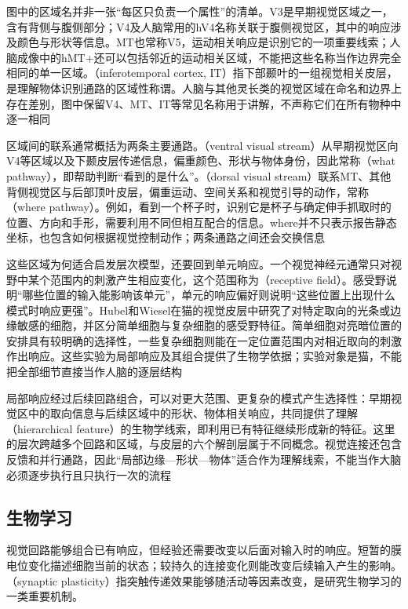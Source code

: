 图中的区域名并非一张“每区只负责一个属性”的清单。V3是早期视觉区域之一，含有背侧与腹侧部分；V4及人脑常用的hV4名称关联于腹侧视觉区，其中的响应涉及颜色与形状等信息。MT也常称V5，运动相关响应是识别它的一项重要线索；人脑成像中的hMT+还可以包括邻近的运动相关区域，不能把这些名称当作边界完全相同的单一区域。（inferotemporal cortex, IT）指下部颞叶的一组视觉相关皮层，是理解物体识别通路的区域性称谓。人脑与其他灵长类的视觉区域在命名和边界上存在差别，图中保留V4、MT、IT等常见名称用于讲解，不声称它们在所有物种中逐一相同

区域间的联系通常概括为两条主要通路。（ventral visual stream）从早期视觉区向V4等区域以及下颞皮层传递信息，偏重颜色、形状与物体身份，因此常称（what pathway），即帮助判断“看到的是什么”。（dorsal visual stream）联系MT、其他背侧视觉区与后部顶叶皮层，偏重运动、空间关系和视觉引导的动作，常称（where pathway）。例如，看到一个杯子时，识别它是杯子与确定伸手抓取时的位置、方向和手形，需要利用不同但相互配合的信息。where并不只表示报告静态坐标，也包含如何根据视觉控制动作；两条通路之间还会交换信息

\FloatBarrier
这些区域为何适合启发层次模型，还要回到单元响应。一个视觉神经元通常只对视野中某个范围内的刺激产生相应变化，这个范围称为（receptive field）。感受野说明“哪些位置的输入能影响该单元”，单元的响应偏好则说明“这些位置上出现什么模式时响应更强”。Hubel和Wiesel在猫的视觉皮层中研究了对特定取向的光条或边缘敏感的细胞，并区分简单细胞与复杂细胞的感受野特征。简单细胞对亮暗位置的安排具有较明确的选择性，一些复杂细胞则能在一定位置范围内对相近取向的刺激作出响应。这些实验为局部响应及其组合提供了生物学依据；实验对象是猫，不能把全部细节直接当作人脑的逐层结构

局部响应经过后续回路组合，可以对更大范围、更复杂的模式产生选择性：早期视觉区中的取向信息与后续区域中的形状、物体相关响应，共同提供了理解（hierarchical feature）的生物学线索，即利用已有特征继续形成新的特征。这里的层次跨越多个回路和区域，与皮层的六个解剖层属于不同概念。视觉连接还包含反馈和并行通路，因此“局部边缘—形状—物体”适合作为理解线索，不能当作大脑必须逐步执行且只执行一次的流程

\subsection{生物学习}
\label{sec:neural-biological-learning}

视觉回路能够组合已有响应，但经验还需要改变以后面对输入时的响应。短暂的膜电位变化描述细胞当前的状态；较持久的连接变化则能改变后续输入产生的影响。（synaptic plasticity）指突触传递效果能够随活动等因素改变，是研究生物学习的一类重要机制。

